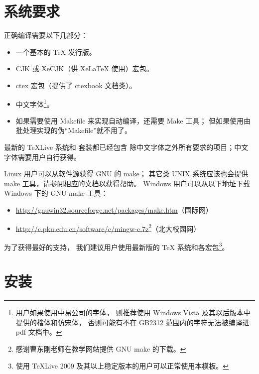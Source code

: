 	\section{系统要求}

	正确编译需要以下几部分：
	\begin{itemize}
		\item 一个基本的 \TeX{} 发行版。
		\item CJK 或 XeCJK（供 Xe\LaTeX{} 使用）宏包。
		\item ctex 宏包\cite{ctex-doc,ctexfaq}（提供了 ctexbook 文档类）。
		\item 中文字体\footnote{%
			用户如果使用中易公司的字体，
			则推荐使用 Windows Vista 及其以后版本中提供的楷体和仿宋体，
			否则可能有不在 GB2312 范围内的字符无法被编译进 pdf 文档中。%
		}。
		\item 如果需要使用 Makefile 来实现自动编译，还需要 Make 工具；
			但如果使用由批处理实现的伪“Makefile”就不用了。
	\end{itemize}

	最新的 \TeX{}Live 系统和 \CTeX{} 套装都已经包含%
	除中文字体之外所有要求的项目；中文字体需要用户自行获得。

	Linux 用户可以从软件源获得 GNU 的 make；
	其它类 UNIX 系统应该也会提供 make 工具，请参阅相应的文档以获得帮助。%
	Windows 用户可以从以下地址下载 Windows 下的 GNU make 工具：
	\begin{itemize}
		\item
		\url{http://gnuwin32.sourceforge.net/packages/make.htm}（国际网）
		\item
		\url{http://c.pku.edu.cn/software/c/mingw-c.7z}\footnote%
		{感谢曹东刚老师在教学网站提供 GNU make 的下载。}（北大校园网）
	\end{itemize}

	为了获得最好的支持，
	我们建议用户使用最新版的 \TeX{} 系统和各宏包\footnote%
		{使用 \TeX{}Live 2009 及其以上稳定版本的用户可以正常使用本模板。}。

	\section{安装\label{sec:inst}}

